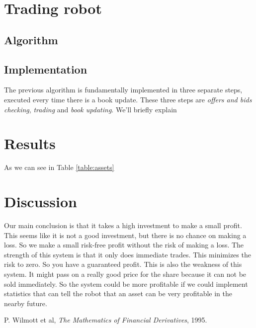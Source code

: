 \documentclass[8 pt]{article}
\begin{document}
\begin{multicols*}{2}

\section{Trading robot}

\subsection{Algorithm}



\subsection{Implementation}

The previous algorithm is fundamentally implemented in three separate steps, executed every time there is a book update. These three steps are \emph{offers and bids checking}, \emph{trading} and \emph{book updating}. We'll briefly explain

\section{Results}

As we can see in Table \ref{table:assets}

\section{Discussion}

Our main conclusion is that it takes a high investment to make a small profit. This seems like it is not a good investment, but there is no chance on making a loss. So we make a small risk-free profit without the risk of making a loss.
The strength of this system is that it only does immediate trades. This minimizes the risk to zero. So you have a guaranteed profit.
This is also the weakness of this system. It might pass on a really good price for the share because it can not be sold immediately. So the system could be more profitable if we could implement statistics that can tell the robot that an asset can be very profitable in the nearby future.

\begin{thebibliography}{28}
\raggedright
{}

 P. Wilmott et al, \emph{The Mathematics of Financial Derivatives}, 1995.

\end{thebibliography}

\end{multicols*}
\end{document}
